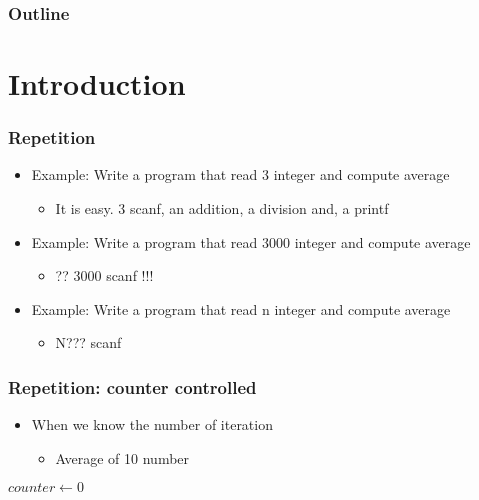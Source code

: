 \documentclass{../c-lecture}
\subtitle{Repeating Statements}
\begin{document}
\begin{frame}
  \titlepage{}
\end{frame}
\begin{frame}
  \frametitle{Outline}
  \tableofcontents{}
\end{frame}

\section{Introduction}

\begin{frame}
  \frametitle{Repetition}
  \begin{itemize}
    \item Example: Write a program that read 3 integer and compute average
    \begin{itemize}
      \item It is easy. 3 scanf, an addition, a division and, a printf
    \end{itemize}
    \item Example: Write a program that read 3000 integer and compute average
    \begin{itemize}
      \item ?? 3000 scanf !!!
    \end{itemize}
    \item Example: Write a program that read n integer and compute average
    \begin{itemize}
      \item N??? scanf
    \end{itemize}
  \end{itemize}
\end{frame}

\begin{frame}
  \frametitle{Repetition: counter controlled}
  \begin{itemize}
    \item When we know the number of iteration
    \begin{itemize}
      \item Average of 10 number
    \end{itemize}
  \end{itemize}
  \begin{algorithm}[H]
  \KwData{}
  \KwResult{}
  $counter \gets 0$\;

  \end{algorithm}
\end{frame}
\end{document}
